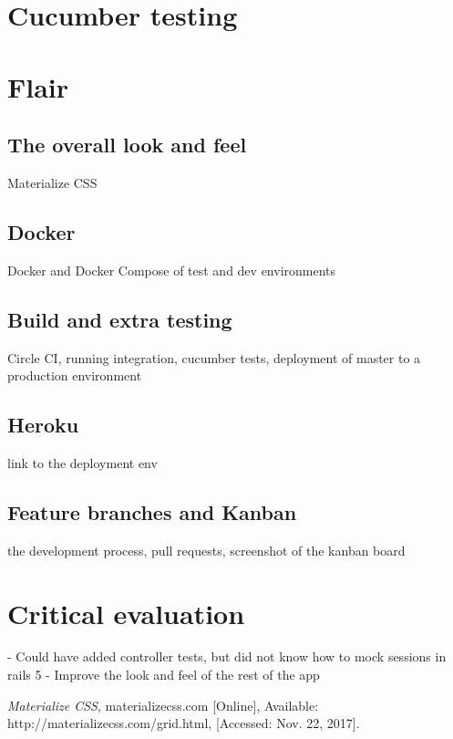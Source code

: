 \documentclass[a4paper, 11pt, titlepage]{article}
\begin{document}
\section{Cucumber testing}

\section{Flair}
\subsection{The overall look and feel}
Materialize CSS

\subsection{Docker}
Docker and Docker Compose of test and dev environments

\subsection{Build and extra testing}
Circle CI, running integration, cucumber tests, deployment of master to a production environment

\subsection{Heroku}
link to the deployment env

\subsection{Feature branches and Kanban}
the development process, pull requests, screenshot of the kanban board

\section{Critical evaluation}
- Could have added controller tests, but did not know how to mock sessions in rails 5
- Improve the look and feel of the rest of the app

\begin{thebibliography}{1}

 \emph{Materialize CSS}, materializecss.com [Online],
Available: http://materializecss.com/grid.html, [Accessed: Nov. 22, 2017].

\end{thebibliography}
\end{document}
